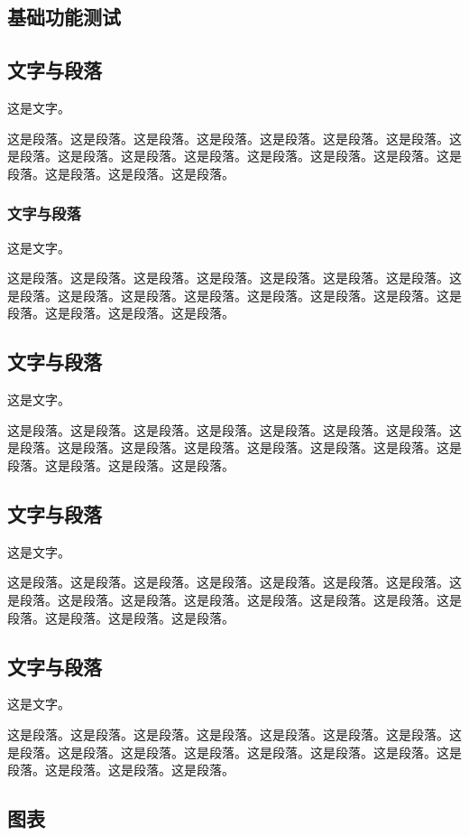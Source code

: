\begin{ujnbody}
    \section{基础功能测试}
    \subsection{文字与段落}
    这是文字。

    这是段落。这是段落。这是段落。这是段落。这是段落。这是段落。这是段落。这是段落。这是段落。这是段落。这是段落。这是段落。这是段落。这是段落。这是段落。这是段落。这是段落。这是段落。
    \subsubsection{文字与段落}
    这是文字。

    这是段落。这是段落。这是段落。这是段落。这是段落。这是段落。这是段落。这是段落。这是段落。这是段落。这是段落。这是段落。这是段落。这是段落。这是段落。这是段落。这是段落。这是段落。
    \subsection{文字与段落}
    这是文字。

    这是段落。这是段落。这是段落。这是段落。这是段落。这是段落。这是段落。这是段落。这是段落。这是段落。这是段落。这是段落。这是段落。这是段落。这是段落。这是段落。这是段落。这是段落。
    \subsection{文字与段落}
    这是文字。

    这是段落。这是段落。这是段落。这是段落。这是段落。这是段落。这是段落。这是段落。这是段落。这是段落。这是段落。这是段落。这是段落。这是段落。这是段落。这是段落。这是段落。这是段落。
    \subsection{文字与段落}
    这是文字。

    这是段落。这是段落。这是段落。这是段落。这是段落。这是段落。这是段落。这是段落。这是段落。这是段落。这是段落。这是段落。这是段落。这是段落。这是段落。这是段落。这是段落。这是段落。
    \subsection{图表}


\end{ujnbody}

